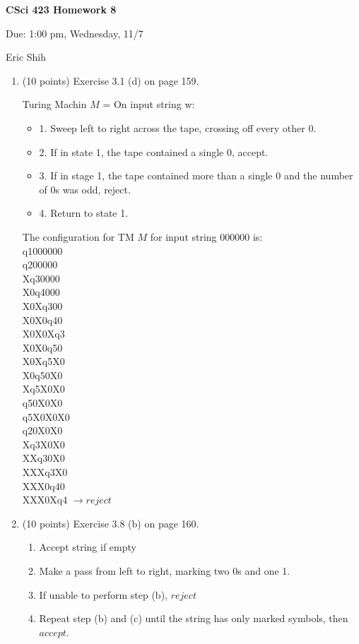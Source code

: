 \documentclass[11pt]{article}
\begin{document}
\begin{LARGE}
\centerline {\bf CSci 423 Homework 8}
\end{LARGE}
\vskip 0.25cm

\centerline{Due: 1:00 pm, Wednesday, 11/7}
\centerline{Eric Shih}

\begin{enumerate}
  \item (10 points) Exercise 3.1 (d) on page 159.
    \begin{center}
     Turing Machin $M$ = On input string w:
     \begin{itemize}
      \item{1.} Sweep left to right across the tape, crossing off every other 0.
      \item{2.} If in state 1, the tape contained a single 0, accept.
      \item{3.} If in stage 1, the tape contained more than a single 0 and the number of 0s was odd, reject.
      \item{4.} Return to state 1.
     \end{itemize}
    \end{center}
    
     The configuration for TM $M$ for input string 000000 is: \\
     q1000000 \\ q200000 \\ Xq30000 \\ X0q4000 \\ X0Xq300 \\ X0X0q40 \\ X0X0Xq3 \\ X0X0q50 \\ X0Xq5X0 \\ X0q50X0 \\ Xq5X0X0 \\ q50X0X0 \\
     q5X0X0X0 \\ q20X0X0 \\ Xq3X0X0 \\ XXq30X0 \\ XXXq3X0 \\ XXX0q40 \\ XXX0Xq4 $\to reject$

  \item (10 points) Exercise 3.8 (b) on page 160.
    \begin{enumerate}
     \item Accept string if empty
     \item Make a pass from left to right, marking two 0s and one 1.
     \item If unable to perform step (b), $reject$
     \item Repeat step (b) and (c) until the string has only marked symbols, then $accept$.
    \end{enumerate}


\end{enumerate}
\end{document}
